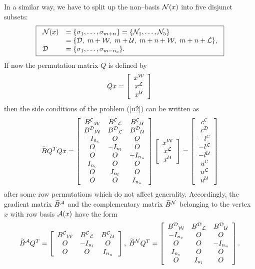 \par
In a similar way, we have to split up the non--basis $\N(x)$ into five
disjunct subsets:
%
\begin{equation} \label{u8}
\fbox{$
\ba{.}{ll}
\N(x) &= \{\sigma _1, \ldots, \sigma _{m+n} \}
      = \{\N_1, \ldots, \N_5\} \\
     &= \{\D, \; m + \W , \;  m + \U, \; m + n + \W, \; m + n + \L \},\\
\D   & = \{\sigma _1, \ldots , \sigma _{m - n_c}\}.
\ea{.}
$}
\end{equation}
%
%
If now the permutation matrix $Q$ is defined by
\[
Qx = \ba{[}{c}x^{\W} \\ x^{\L} \\ x^{\U} \ea{]}
\]
then the side conditions of the problem (\ref{u2}) can be written as
%
\[ \wi{B}Q^TQx =
\ba{[}{ccc}
B^{\C}{}_{\W} & B^{\C}{}_{\L} & B^{\C}{}_{\U}\\
B^{\D}{}_{\W} & B^{\D}{}_{\L} & B^{\D}{}_{\U}\\
- I_{n_c}     & O             & O\\
O             & - I_{n_l}     & O\\
O             & O             & - I_{n_u}\\
  I_{n_c}     & O             & O\\
O             & I_{n_l}       & O\\
O             & O             & I_{n_u}
\ea{]}
\ba{[}{c} x^{\W} \\ x^{\L} \\ x^{\U} \ea{]}
=
\ba{[}{c} c^{\C} \\ c^{\D} \\ -l^{\C} \\ -l^{\L} \\  -l^{\U} \\
u^{\C} \\  u^{\L} \\ u^{\U}
\ea{]}
\]
after some row permutations which do not affect generality.
Accordingly, the gradient matrix $\wi{B}^{\A}$ and the complementary matrix
$\wi{B}^{\N}$ belonging to the vertex $x$ with row basis $\A (x)$
have the form
\begin{equation} \label{u6a}
\wi{B}^{\A}Q^T = \ba{[}{ccc}
B^{\C}{}_{\W} & B^{\C}{}_{\L} & B^{\C}{}_{\U}\\
O & - I_{n_l} & O\\
O & O & I_{n_u}
\ea{]}, \;
\wi{B}^{\N}Q^T = \ba{[}{ccc}
B^{\D}{}_{\W} & B^{\D}{}_{\L} & B^{\D}{}_{\U}\\
-I_{n_c}      & O             & O        \\
O             & O             & - I_{n_u}\\
I_{n_c}       & O             & O\\
O             &   I_{n_l}     & O
\ea{]}.
\end{equation}

